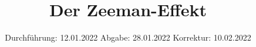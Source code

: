 

\subject{V27}
\title{Der Zeeman-Effekt}
\date{%
  Durchführung: 12.01.2022
  \hspace{3em}
  Abgabe: 28.01.2022
 \hspace{3em}
 Korrektur: 10.02.2022
}



\maketitle
\thispagestyle{empty}
\tableofcontents
\newpage







\printbibliography{}


